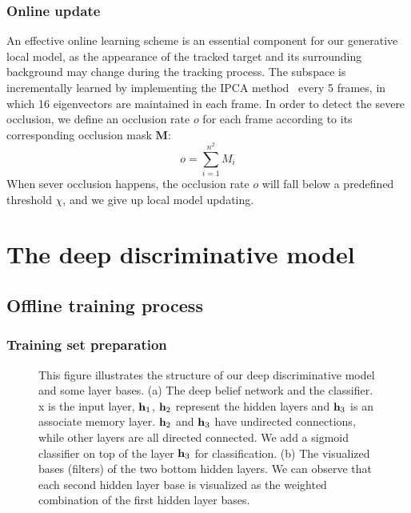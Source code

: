 \documentclass[preprint,12pt,review]{elsarticle}
\begin{document}
\subsubsection{Online update}
An effective online learning scheme is an essential component for our generative local model, as the appearance of the tracked target and its surrounding background may change during the tracking process.
The subspace is incrementally learned by implementing the IPCA method~\cite{ross2008incremental} every 5 frames, in which 16 eigenvectors are maintained in each frame.
In order to detect the severe occlusion, we define an occlusion rate $o$ for each frame according to its corresponding occlusion mask $\mathbf{M}$:
\begin{equation}
  o=\sum \limits_{i=1}^{n^2} M_i \end{equation}
When sever occlusion happens, the occlusion rate $o$ will fall below a predefined threshold $\chi $, and we give up local model updating.

\section{The deep discriminative model}
\subsection{Offline training process}
\subsubsection{Training set preparation}
\begin{figure}[tbp]
\centering
{}
\vspace{-8mm}
\caption{This figure illustrates the structure of our deep discriminative model and some layer bases. (a) The deep belief network and the classifier. x is the input layer, ${{\bf{h}}_1}$, ${{\bf{h}}_2}$ represent the hidden layers and ${{\bf{h}}_3}$ is an associate memory layer.  ${{\bf{h}}_2}$ and ${{\bf{h}}_3}$ have undirected connections, while other layers are all directed connected. We add a sigmoid classifier on top of the layer ${{\bf{h}}_3}$ for classification. (b) The visualized bases (filters) of the two bottom hidden layers. We can observe that each second hidden layer base is visualized as the weighted combination of the first hidden layer bases.}
\label{fig:DBN}
\end{figure}
\end{document}
